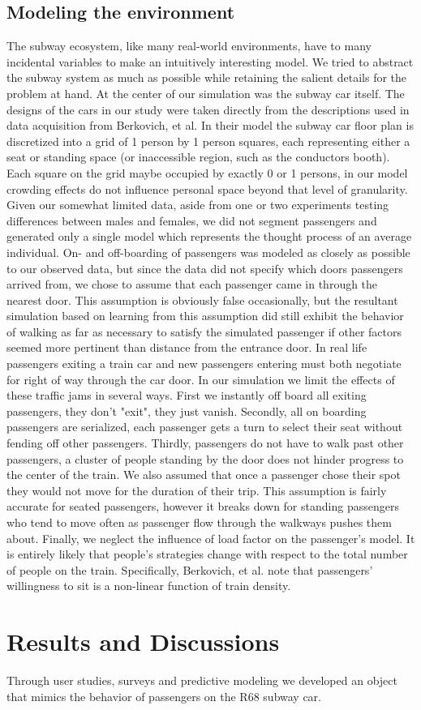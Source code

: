 \documentclass{acm_proc_article-sp}
\begin{document}
\subsection{Modeling the environment}
The subway ecosystem, like many real-world environments, have to many incidental variables to make an intuitively interesting model. We tried to abstract the subway system as much as possible while retaining the salient details for the problem at hand. At the center of our simulation was the subway car itself. The designs of the cars in our study were taken directly from the descriptions used in data acquisition from Berkovich, et al. In their model the subway car floor plan is discretized into a grid of 1 person by 1 person squares, each representing either a seat or standing space (or inaccessible region, such as the conductors booth). Each square on the grid maybe occupied by exactly 0 or 1 persons, in our model crowding effects do not influence personal space beyond that level of granularity. Given our somewhat limited data, aside from one or two experiments testing differences between males and females, we did not segment passengers and generated only a single model which represents the thought process of an average individual. On- and off-boarding of passengers was modeled as closely as possible to our observed data, but since the data did not specify which doors passengers arrived from, we chose to assume that each passenger came in through the nearest door. This assumption is obviously false occasionally, but the resultant simulation based on learning from this assumption did still exhibit the behavior of walking as far as necessary to satisfy the simulated passenger if other factors seemed more pertinent than distance from the entrance door. In real life passengers exiting a train car and new passengers entering must both negotiate for right of way through the car door. In our simulation we limit the effects of these traffic jams in several ways. First we instantly off board all exiting passengers, they don't "exit", they just vanish. Secondly, all on boarding passengers are serialized, each passenger gets a turn to select their seat without fending off other passengers. Thirdly, passengers do not have to walk past other passengers, a cluster of people standing by the door does not hinder progress to the center of the train. We also assumed that once a passenger chose their spot they would not move for the duration of their trip. This assumption is fairly accurate for seated passengers, however it breaks down for standing passengers who tend to move often as passenger flow through the walkways pushes them about. Finally, we neglect the influence of load factor on the passenger's model. It is entirely likely that people's strategies change with respect to the total number of people on the train. Specifically, Berkovich, et al. note that passengers' willingness to sit is a non-linear function of train density.


\section{Results and Discussions}
Through user studies, surveys and predictive modeling we developed an object that mimics the behavior of passengers on the R68 subway car.




\end{document}
